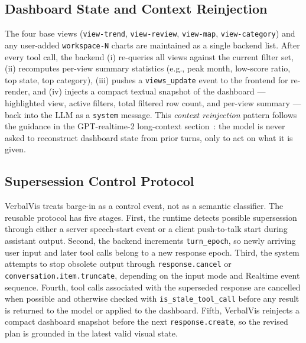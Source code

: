 \documentclass[journal]{IEEEtran}
\begin{document}
\subsection{Dashboard State and Context Reinjection}
The four base views (\texttt{view-trend}, \texttt{view-review}, \texttt{view-map}, \texttt{view-category}) and any user-added \texttt{workspace-N} charts are maintained as a single backend list. After every tool call, the backend (i) re-queries all views against the current filter set, (ii) recomputes per-view summary statistics (e.g., peak month, low-score ratio, top state, top category), (iii) pushes a \texttt{views\_update} event to the frontend for re-render, and (iv) injects a compact textual snapshot of the dashboard --- highlighted view, active filters, total filtered row count, and per-view summary --- back into the LLM as a \texttt{system} message. This \emph{context reinjection} pattern follows the guidance in the GPT-realtime-2 long-context section~\cite{openai_realtime_prompt}: the model is never asked to reconstruct dashboard state from prior turns, only to act on what it is given.

\subsection{Supersession Control Protocol}
VerbalVis treats barge-in as a control event, not as a semantic classifier. The reusable protocol has five stages. First, the runtime detects possible supersession through either a server speech-start event or a client push-to-talk start during assistant output. Second, the backend increments \texttt{turn\_epoch}, so newly arriving user input and later tool calls belong to a new response epoch. Third, the system attempts to stop obsolete output through \texttt{response.cancel} or \texttt{conversation.item.truncate}, depending on the input mode and Realtime event sequence. Fourth, tool calls associated with the superseded response are cancelled when possible and otherwise checked with \texttt{is\_stale\_tool\_call} before any result is returned to the model or applied to the dashboard. Fifth, VerbalVis reinjects a compact dashboard snapshot before the next \texttt{response.create}, so the revised plan is grounded in the latest valid visual state.
\end{document}
